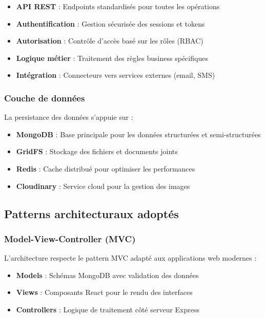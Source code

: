\begin{itemize}
\item \textbf{API REST} : Endpoints standardisés pour toutes les opérations
\item \textbf{Authentification} : Gestion sécurisée des sessions et tokens
\item \textbf{Autorisation} : Contrôle d'accès basé sur les rôles (RBAC)
\item \textbf{Logique métier} : Traitement des règles business spécifiques
\item \textbf{Intégration} : Connecteurs vers services externes (email, SMS)
\end{itemize}

\subsubsection{Couche de données}

La persistance des données s'appuie sur :

\begin{itemize}
\item \textbf{MongoDB} : Base principale pour les données structurées et semi-structurées
\item \textbf{GridFS} : Stockage des fichiers et documents joints
\item \textbf{Redis} : Cache distribué pour optimiser les performances
\item \textbf{Cloudinary} : Service cloud pour la gestion des images
\end{itemize}

\subsection{Patterns architecturaux adoptés}

\subsubsection{Model-View-Controller (MVC)}

L'architecture respecte le pattern MVC adapté aux applications web modernes :

\begin{itemize}
\item \textbf{Models} : Schémas MongoDB avec validation des données
\item \textbf{Views} : Composants React pour le rendu des interfaces
\item \textbf{Controllers} : Logique de traitement côté serveur Express
\end{itemize}


